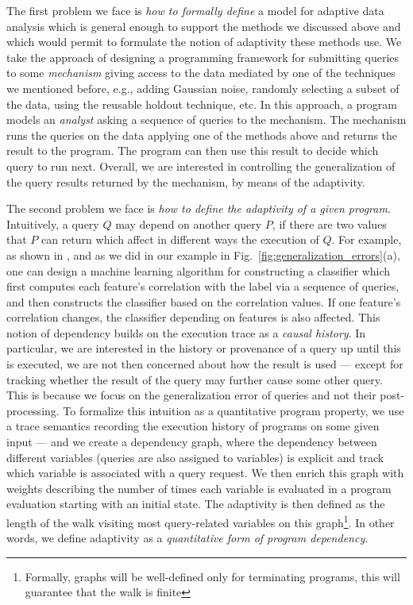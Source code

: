 The first problem we face is \emph{how to formally define} a model for adaptive data analysis which is general enough to support the methods we discussed above and which would permit to formulate the notion of adaptivity these methods use. We take the approach of designing a programming framework for submitting queries to some \emph{mechanism} giving access to the data mediated by one of the techniques we mentioned before, e.g., adding Gaussian noise, randomly selecting a subset of the data, using the reusable holdout technique, etc. In this approach, a program models an \emph{analyst} asking a sequence of queries to the mechanism. The mechanism runs the queries on the data applying one of the methods above and returns the result to the program. The program can then use this result to decide which query to run next. Overall, we are interested in controlling the generalization of the query results returned by the mechanism, by means of the adaptivity. 

The second problem we face is \emph{how to define the adaptivity of a given program}.
Intuitively, a query $Q$ may depend on another query $P$, if there are two values that $P$ can return which affect in different ways the execution of $Q$. 
For example, as shown in \cite{dwork2015reusable}, and as we did in our example in Fig.~\ref{fig:generalization_errors}(a), one can design a machine learning algorithm for constructing a classifier which first computes each feature's correlation with the label via a sequence of queries, and then constructs the classifier based on the correlation values. If one feature's correlation changes, the classifier depending on features is also affected.  
This notion of dependency builds on the execution trace as a \emph{causal history}. In particular, we are interested in the history or provenance of a query up until this is executed, we are not then concerned about how the result is used --- except for tracking whether the result of the query may further cause some other query. This is because we focus on the generalization error of queries and not their post-processing. %
To formalize this intuition as a quantitative program property,
we use a trace semantics recording the execution history of programs on some given input --- and we create a dependency graph, where the dependency between different variables (queries are also assigned to variables) is explicit and track which variable is associated with a query request. We then enrich this graph with weights describing the number of times each variable is evaluated in a program evaluation starting with an initial state. The adaptivity is then defined as the length of the walk visiting most query-related variables on this graph\footnote{Formally, graphs will be well-defined only for terminating programs, this will guarantee that the walk is finite}. In other words, we define adaptivity as a \emph{quantitative form of program dependency}.

